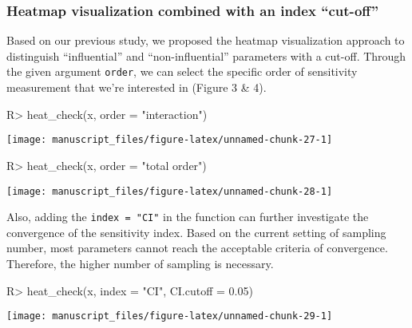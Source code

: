 \documentclass[article]{jss}
\begin{document}
\hypertarget{heatmap-visualization-combined-with-an-index-cut-off}{%
\subsubsection{Heatmap visualization combined with an index
``cut-off''}\label{heatmap-visualization-combined-with-an-index-cut-off}}

Based on our previous study, we proposed the heatmap visualization
approach to distinguish ``influential'' and ``non-influential''
parameters with a cut-off. Through the given argument \texttt{order}, we
can select the specific order of sensitivity measurement that we're
interested in (Figure 3 \& 4).

\begin{CodeChunk}

\begin{CodeInput}
R> heat_check(x, order = "interaction")
\end{CodeInput}


\begin{center}\texttt{[image: manuscript\_files/figure-latex/unnamed-chunk-27-1]} \end{center}

\end{CodeChunk}

\begin{CodeChunk}

\begin{CodeInput}
R> heat_check(x, order = "total order")
\end{CodeInput}


\begin{center}\texttt{[image: manuscript\_files/figure-latex/unnamed-chunk-28-1]} \end{center}

\end{CodeChunk}

Also, adding the \texttt{index\ =\ "CI"} in the function can further
investigate the convergence of the sensitivity index. Based on the
current setting of sampling number, most parameters cannot reach the
acceptable criteria of convergence. Therefore, the higher number of
sampling is necessary.

\begin{CodeChunk}

\begin{CodeInput}
R> heat_check(x, index = "CI", CI.cutoff = 0.05)
\end{CodeInput}


\begin{center}\texttt{[image: manuscript\_files/figure-latex/unnamed-chunk-29-1]} \end{center}

\end{CodeChunk}
\end{document}
